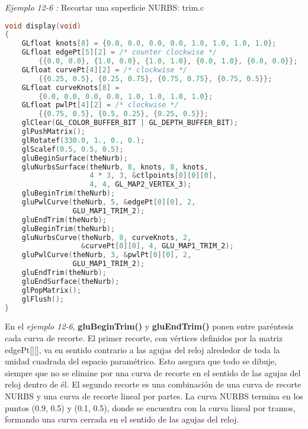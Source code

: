 \emph{Ejemplo 12-6 :} Recortar una superficie NURBS: trim.c

\begin{lstlisting}[language=C++]
void display(void)
{
    GLfloat knots[8] = {0.0, 0.0, 0.0, 0.0, 1.0, 1.0, 1.0, 1.0};
    GLfloat edgePt[5][2] = /* counter clockwise */
        {{0.0, 0.0}, {1.0, 0.0}, {1.0, 1.0}, {0.0, 1.0}, {0.0, 0.0}};
    GLfloat curvePt[4][2] = /* clockwise */
        {{0.25, 0.5}, {0.25, 0.75}, {0.75, 0.75}, {0.75, 0.5}};
    GLfloat curveKnots[8] =
        {0.0, 0.0, 0.0, 0.0, 1.0, 1.0, 1.0, 1.0};
    GLfloat pwlPt[4][2] = /* clockwise */
        {{0.75, 0.5}, {0.5, 0.25}, {0.25, 0.5}};
    glClear(GL_COLOR_BUFFER_BIT | GL_DEPTH_BUFFER_BIT);
    glPushMatrix();
    glRotatef(330.0, 1., 0., 0.);
    glScalef(0.5, 0.5, 0.5);
    gluBeginSurface(theNurb);
    gluNurbsSurface(theNurb, 8, knots, 8, knots,
                    4 * 3, 3, &ctlpoints[0][0][0],
                    4, 4, GL_MAP2_VERTEX_3);
    gluBeginTrim(theNurb);
    gluPwlCurve(theNurb, 5, &edgePt[0][0], 2,
                GLU_MAP1_TRIM_2);
    gluEndTrim(theNurb);
    gluBeginTrim(theNurb);
    gluNurbsCurve(theNurb, 8, curveKnots, 2,
                  &curvePt[0][0], 4, GLU_MAP1_TRIM_2);
    gluPwlCurve(theNurb, 3, &pwlPt[0][0], 2,
                GLU_MAP1_TRIM_2);
    gluEndTrim(theNurb);
    gluEndSurface(theNurb);
    glPopMatrix();
    glFlush();
}
\end{lstlisting}

En el \emph{ejemplo 12-6}, \textbf{gluBeginTrim()} y \textbf{gluEndTrim()}
ponen entre paréntesis cada curva de recorte. El primer recorte, con
vértices definidos por la matriz edgePt[][], va en sentido contrario
a las agujas del reloj alrededor de toda la unidad cuadrada del espacio
paramétrico. Esto asegura que todo se dibuje, siempre que no se elimine
por una curva de recorte en el sentido de las agujas del reloj dentro
de él. El segundo recorte es una combinación de una curva de recorte
NURBS y una curva de recorte lineal por partes. La curva NURBS termina
en los puntos (0.9, 0.5) y (0.1, 0.5), donde se encuentra con la curva
lineal por tramos, formando una curva cerrada en el sentido de las agujas del reloj.
